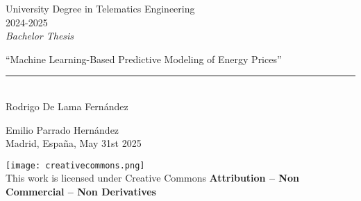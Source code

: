\documentclass[12pt]{report} %
\begin{document}
	
\begin{titlepage}
	\begin{sffamily}
	\color{azulUC3M}
	\begin{center}
		\begin{figure}[H] %
		\end{figure}
		\vspace{2.5cm}
		\begin{Large}
			University Degree in Telematics Engineering\\			
			 2024-2025\\ %
			\vspace{2cm}		
			\textsl{Bachelor Thesis}
			\bigskip
			
		\end{Large}
		 	{\Huge ``Machine Learning-Based Predictive Modeling of Energy Prices''}\\
		 	\vspace*{0.5cm}
	 		\rule{10.5cm}{0.1mm}\\
			\vspace*{0.9cm}
			{\LARGE Rodrigo De Lama Fernández}\\ 
			\vspace*{1cm}
		\begin{Large}
			Emilio Parrado Hernández\\
			Madrid, España, May 31st 2025\\
		\end{Large}
	\end{center}
	\vfill
	\color{black}
	\texttt{[image: creativecommons.png]}\\ %
    This work is licensed under Creative Commons \textbf{Attribution – Non Commercial – Non Derivatives}
	\end{sffamily}
\end{titlepage}

\newpage %
\thispagestyle{empty}
\mbox{}
\end{document}
